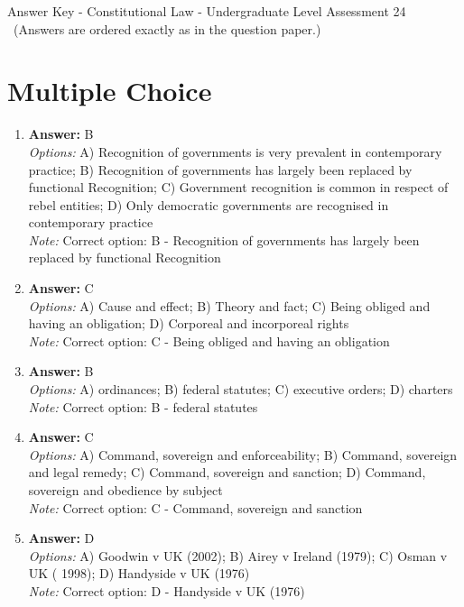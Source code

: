 \documentclass[12pt]{article}
\begin{document}
\begin{center}
Answer Key - Constitutional Law - Undergraduate Level Assessment 24 \
\small (Answers are ordered exactly as in the question paper.)
\end{center}

\section*{Multiple Choice}
\begin{enumerate}[label=\arabic*.]
\item \textbf{Answer:} B
\\ \textit{Options:} A) Recognition of governments is very prevalent in contemporary practice; B) Recognition of governments has largely been replaced by functional Recognition; C) Government recognition is common in respect of rebel entities; D) Only democratic governments are recognised in contemporary practice
\\ \textit{Note:} Correct option: B - Recognition of governments has largely been replaced by functional Recognition
\item \textbf{Answer:} C
\\ \textit{Options:} A) Cause and effect; B) Theory and fact; C) Being obliged and having an obligation; D) Corporeal and incorporeal rights
\\ \textit{Note:} Correct option: C - Being obliged and having an obligation
\item \textbf{Answer:} B
\\ \textit{Options:} A) ordinances; B) federal statutes; C) executive orders; D) charters
\\ \textit{Note:} Correct option: B - federal statutes
\item \textbf{Answer:} C
\\ \textit{Options:} A) Command, sovereign and enforceability; B) Command, sovereign and legal remedy; C) Command, sovereign and sanction; D) Command, sovereign and obedience by subject
\\ \textit{Note:} Correct option: C - Command, sovereign and sanction
\item \textbf{Answer:} D
\\ \textit{Options:} A) Goodwin v UK (2002); B) Airey v Ireland (1979); C) Osman v UK ( 1998); D) Handyside v UK (1976)
\\ \textit{Note:} Correct option: D - Handyside v UK (1976)
\end{enumerate}
\end{document}
